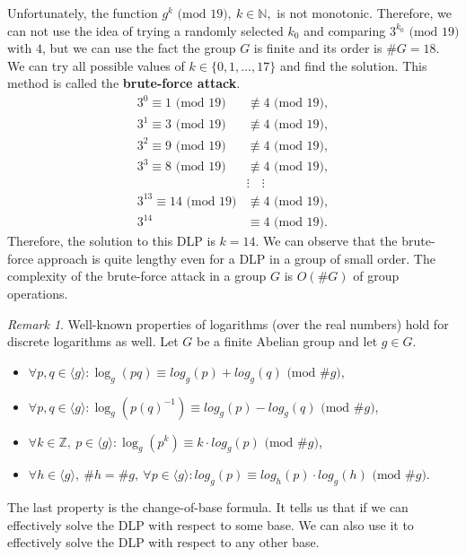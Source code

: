 \documentclass[thesis=M,english]{FITthesis}[2012/10/20]
\theoremstyle{remark}
\newtheorem*{RM}{Remark}
\theoremstyle{definition}
\begin{document}
\noindent Unfortunately, the function $g^k \text{ (mod 19)},\ k \in \mathbb{N},$ is not monotonic. Therefore, we can not use the idea of trying a randomly selected $k_0$ and comparing $3^{k_0} \text{ (mod 19)}$ with $4$, but we can use the fact the group $G$ is finite and its order is $\#G = 18$. We can try all possible values of $k \in \{0, 1, \ldots, 17\}$ and find the solution. This method is called the \textbf{brute-force attack}. 
\begin{align*}
3^0 \equiv 1 \text{ (mod 19)} &\not\equiv 4 \text{ (mod 19)}, \\
3^1 \equiv 3 \text{ (mod 19)} &\not\equiv 4 \text{ (mod 19)}, \\
3^2 \equiv 9 \text{ (mod 19)} &\not\equiv 4 \text{ (mod 19)}, \\
3^3 \equiv 8 \text{ (mod 19)} &\not\equiv 4 \text{ (mod 19)}, \\
&\vdots \quad \vdots \\
3^{13} \equiv 14 \text{ (mod 19)} &\not\equiv 4 \text{ (mod 19)}, \\
3^{14} &\equiv 4 \text{ (mod 19)}.
\end{align*}
Therefore, the solution to this DLP is $k = 14$. We can observe that the brute-force approach is quite lengthy even for a DLP in a group of small order. The complexity of the brute-force attack in a group $G$ is $O(\#G)$ of group operations.
\begin{RM}
Well-known properties of logarithms (over the real numbers) hold for discrete logarithms as well. Let $G$ be a finite Abelian group and let $g \in G$.
\begin{itemize}
\item $\forall p, q \in \langle g \rangle: \log_g(pq) \equiv log_g(p) + log_g(q) \text{ (mod $\#g$)}$,
\item $\forall p, q \in \langle g \rangle: \log_g(p(q)^{-1}) \equiv log_g(p) - log_g(q) \text{ (mod $\#g$)}$,
\item $\forall k \in \mathbb{Z},\ p \in \langle g \rangle: \log_g(p^k) \equiv k \cdot log_g(p) \text{ (mod $\#g$)}$,
\item $\forall h \in \langle g \rangle,\ \#h  = \#g,\ \forall p \in \langle g \rangle: log_g(p) \equiv log_h(p) \cdot log_g(h)  \text{ (mod $\#g$)}$.
\end{itemize}
The last property is the change-of-base formula. It tells us that if we can effectively solve the DLP with respect to some base. We can also use it to effectively solve the DLP with respect to any other base.
\end{RM}
\end{document}
